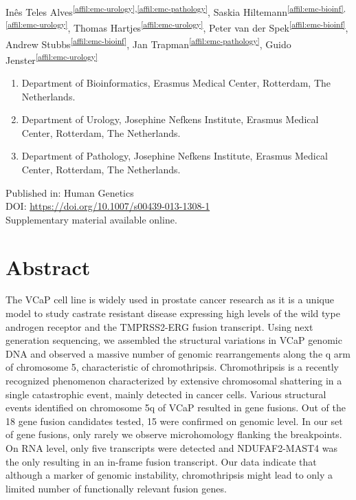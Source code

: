 Inês Teles Alves\textsuperscript{\ref{affil:emc-urology},\ref{affil:emc-pathology}},
Saskia Hiltemann\textsuperscript{\ref{affil:emc-bioinf},\ref{affil:emc-urology}},
Thomas Hartjes\textsuperscript{\ref{affil:emc-urology}},
Peter van der Spek\textsuperscript{\ref{affil:emc-bioinf}},
Andrew Stubbs\textsuperscript{\ref{affil:emc-bioinf}},
Jan Trapman\textsuperscript{\ref{affil:emc-pathology}},
Guido Jenster\textsuperscript{\ref{affil:emc-urology}}

\small
\begin{enumerate}
\itemsep-0.5em
\item Department of Bioinformatics, Erasmus Medical Center, Rotterdam, The Netherlands. \label{affil:emc-bioinf}
\item Department of Urology, Josephine Nefkens Institute, Erasmus Medical Center, Rotterdam, The Netherlands. \label{affil:emc-urology}
\item Department of Pathology, Josephine Nefkens Institute, Erasmus Medical Center, Rotterdam, The Netherlands. \label{affil:emc-pathology}
\end{enumerate}
\normalsize


Published in: Human Genetics \\
DOI: \url{https://doi.org/10.1007/s00439-013-1308-1} \\
Supplementary material available online. \\

\section*{Abstract}
The VCaP cell line is widely used in prostate cancer research as it is a unique model to study castrate resistant disease expressing high levels of the wild type androgen receptor and the TMPRSS2-ERG fusion transcript. Using next generation sequencing, we assembled the structural variations in VCaP genomic DNA and observed a massive number of genomic rearrangements along the q arm of chromosome 5, characteristic of chromothripsis. Chromothripsis is a recently recognized phenomenon characterized by extensive chromosomal shattering in a single catastrophic event, mainly detected in cancer cells. Various structural events identified on chromosome 5q of VCaP resulted in gene fusions. Out of the 18 gene fusion candidates tested, 15 were confirmed on genomic level. In our set of gene fusions, only rarely we observe microhomology flanking the breakpoints. On RNA level, only five transcripts were detected and NDUFAF2-MAST4 was the only resulting in an in-frame fusion transcript. Our data indicate that although a marker of genomic instability, chromothripsis might lead to only a limited number of functionally relevant fusion genes.


